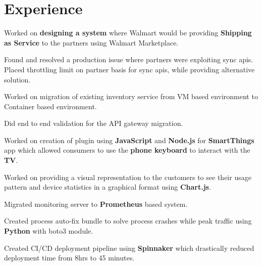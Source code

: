 \documentclass[]{plushcv}
\begin{document}
\begin{minipage}[t]{0.70\textwidth} 



\section{Experience}
\vspace{\topsep} %
\begin{tightemize}
\sectionsep
\item Worked on \textbf{designing a system} where Walmart would be providing \textbf{Shipping as Service} to the partners using Walmart Marketplace.
\item Found and resolved a production issue where partners were exploiting sync apis. Placed throttling limit on partner basis for sync apis, while providing alternative solution.
\item Worked on migration of existing inventory service from VM based environment to Container based environment.
\item Did end to end validation for the API gateway migration.
\end{tightemize}
\sectionsep

\begin{tightemize}
\sectionsep
\item Worked on creation of plugin using \textbf{JavaScript} and \textbf{Node.js} for \textbf{SmartThings} app which allowed consumers to use the \textbf{phone keyboard} to interact with the \textbf{TV}.
\item Worked on providing a visual representation to the customers to see their usage pattern and device statistics in a graphical format using \textbf{Chart.js}.
\item Migrated monitoring server to \textbf{Prometheus} based system.
\item Created process auto-fix bundle to solve process crashes while peak traffic using \textbf{Python} with boto3 module.
\item Created CI/CD deployment pipeline using \textbf{Spinnaker} which drastically reduced deployment time from 8hrs to 45 minutes.
\end{tightemize}
\sectionsep


\end{minipage}
\end{document}
